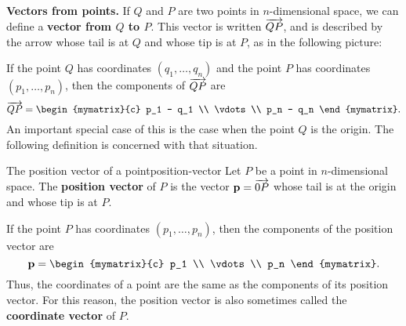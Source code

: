 \noindent\textbf{Vectors from points.}
If $Q$ and $P$ are two points in $n$-dimensional space, we can define
a \textbf{vector from $Q$ to $P$}. This
vector is written $\overrightarrow{QP}$, and is described by the arrow whose
tail is at $Q$ and whose tip is at $P$, as in the following picture:
\begin{center}
\end{center}
If the point $Q$ has coordinates $(q_1,\ldots,q_n)$ and the point $P$
has coordinates $(p_1,\ldots,p_n)$, then the components of
$\overrightarrow{QP}$ are
\begin{equation*}
  \longvect{QP} =
  \begin{mymatrix}{c}
    p_1 - q_1 \\
    \vdots    \\
    p_n - q_n
  \end{mymatrix}.
\end{equation*}
An important special case of this is the case when the point $Q$ is
the origin. The following definition is concerned with that situation.

\begin{definition}{The position vector of a point}{position-vector}
  Let $P$ be a point in $n$-dimensional space. The \textbf{position
    vector} of $P$ is the vector
  $\mbox{\bf p} = \overrightarrow{0P}$ whose tail is at the origin and whose tip
  is at $P$.
  \begin{center}
  \end{center}
  If the point $P$ has coordinates $(p_1,\ldots,p_n)$, then the
  components of the position vector are
  \begin{equation*}
    \vect{p} =
    \begin{mymatrix}{c}
      p_1    \\
      \vdots \\
      p_n
    \end{mymatrix}.
  \end{equation*}
  Thus, the coordinates of a point are the same as the components of
  its position vector. For this reason, the position vector is also
  sometimes called the
  \textbf{coordinate vector} of $P$.
\end{definition}

